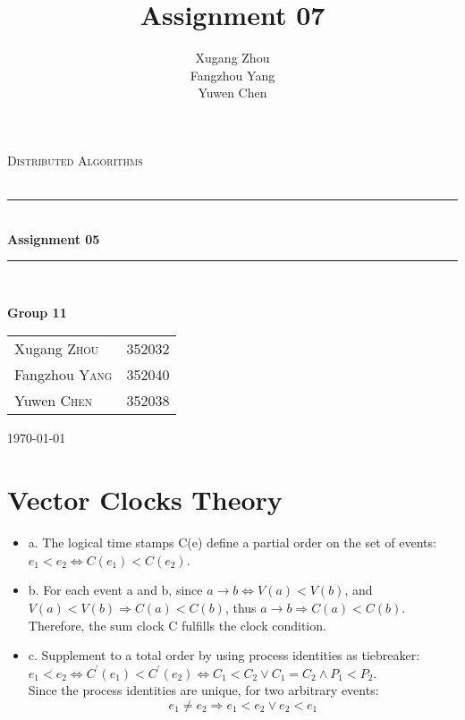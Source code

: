 \documentclass[a4paper, 14pt]{article}
\title{\bf Assignment 07}
\author{Xugang Zhou \\ Fangzhou Yang \\ Yuwen Chen}
\newcommand{\HRule}{\rule{\linewidth}{0.5mm}}
\begin{document}
\begin{titlepage}
\begin{center}
\vfill
\textsc{\LARGE Distributed Algorithms}\\[1.5cm]
\textsc{\Large }\\[0.5cm]

\HRule \\[0.4cm]
{\huge \bfseries Assignment 05}\\[0.4cm]
\HRule \\[1.5cm]
\begin{minipage}{0.4\textwidth}
\begin{flushleft} \large
\large{\textbf{Group 11}}
\end{flushleft}
\end{minipage}
\begin{minipage}{0.4\textwidth}
\begin{flushright} \large
\begin{tabular}{ll}
Xugang \textsc{Zhou} & 352032\\
Fangzhou \textsc{Yang} & 352040\\
Yuwen \textsc{Chen} & 352038
\end{tabular}
\end{flushright}
\end{minipage}
\vfill
{\large \today}\\
\end{center}
\end{titlepage}
\thispagestyle{fancy}

\section{Vector Clocks Theory}
\begin{itemize}
\item a. The logical time stamps C(e) define a partial order on the set of events: $e_1<e_2 \Leftrightarrow C(e_1) < C(e_2)$.
\item b. For each event a and b, since $a \rightarrow b \Leftrightarrow V(a) < V(b)$, and $V(a)<V(b) \Rightarrow C(a)<C(b)$, thus $a \rightarrow b \Rightarrow C(a)<C(b)$. Therefore, the sum clock C fulfills the clock condition.
\item c. Supplement to a total order by using process identities as tiebreaker: $e_1 < e_2 \Leftrightarrow C^{'}(e_1)<C^{'}(e_2) \Leftrightarrow C_1 < C_2 \vee C_1 = C_2 \wedge P_1 < P_2$. \\
    Since the process identities are unique, for two arbitrary events: $$e_1 \ne e_2 \Rightarrow e_1 < e_2 \vee e_2 < e_1$$
\end{itemize}
\end{document}
